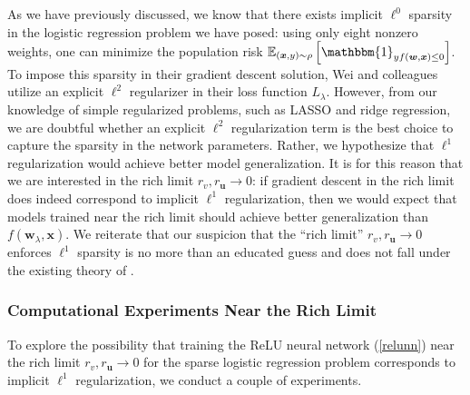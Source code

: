 \documentclass{article}
\begin{document}
As we have previously discussed, we know that there exists implicit $\ell^0$ sparsity in the logistic regression problem we have posed: using only eight nonzero weights, one can minimize the population risk $\mathbb{E}_{(\boldsymbol{x}, y) \sim \rho} \left[ \mathbbm{1}_{y f(\boldsymbol{w}, \boldsymbol{x}) \leq 0} \right]$. To impose this sparsity in their gradient descent solution, Wei and colleagues utilize an explicit $\ell^2$ regularizer in their loss function $L_{\lambda}$. However, from our knowledge of simple regularized problems, such as LASSO and ridge regression, we are doubtful whether an explicit $\ell^2$ regularization term is the best choice to capture the sparsity in the network parameters. Rather, we hypothesize that $\ell^1$ regularization would achieve better model generalization. It is for this reason that we are interested in the rich limit $r_v, r_{\boldsymbol{u}} \rightarrow 0$: if gradient descent in the rich limit does indeed correspond to implicit $\ell^1$ regularization, then we would expect that models trained near the rich limit should achieve better generalization than $f(\boldsymbol{w}_{\lambda}, \boldsymbol{x})$. We reiterate that our suspicion that the \enquote{rich limit} $r_v, r_{\boldsymbol{u}} \rightarrow 0$ enforces $\ell^1$ sparsity is no more than an educated guess and does not fall under the existing theory of \cite{chizat2018lazy}.

\subsubsection{Computational Experiments Near the Rich Limit}

To explore the possibility that training the ReLU neural network (\ref{relunn}) near the rich limit $r_v, r_{\boldsymbol{u}} \rightarrow 0$ for the sparse logistic regression problem corresponds to implicit $\ell^1$ regularization, we conduct a couple of experiments.
\end{document}
